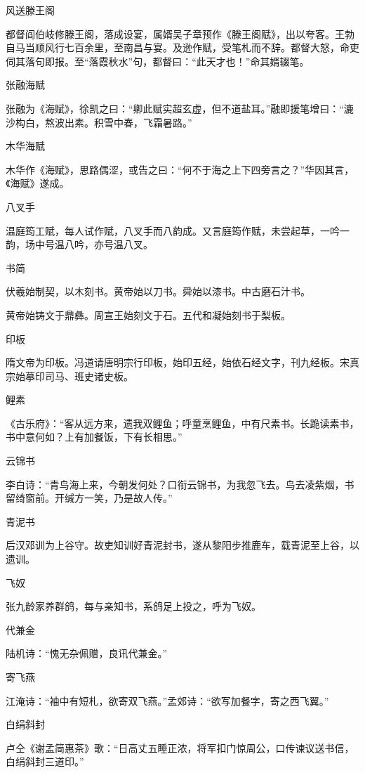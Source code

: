 \documentclass[a4paper,12pt,UTF8,twoside]{ctexbook}
\begin{document}
    风送滕王阁
    
    都督阎伯岐修滕王阁，落成设宴，属婿吴子章预作《滕王阁赋》，出以夸客。王勃自马当顺风行七百余里，至南昌与宴。及逊作赋，受笔札而不辞。都督大怒，命吏伺其落句即报。至“落霞秋水”句，都督曰：“此天才也！”命其婿辍笔。
    
    张融海赋
    
    张融为《海赋》，徐凯之曰：“卿此赋实超玄虚，但不道盐耳。”融即援笔增曰：“漉沙构白，熬波出素。积雪中春，飞霜暑路。”
    
    木华海赋
    
    木华作《海赋》，思路偶涩，或告之曰：“何不于海之上下四旁言之？”华因其言，《海赋》遂成。
    
    八叉手
    
    温庭筠工赋，每人试作赋，八叉手而八韵成。又言庭筠作赋，未尝起草，一吟一韵，场中号温八吟，亦号温八叉。
    
    书简
    
    伏羲始制契，以木刻书。黄帝始以刀书。舜始以漆书。中古磨石汁书。
    
    黄帝始铸文于鼎彝。周宣王始刻文于石。五代和凝始刻书于梨板。
    
    印板
    
    隋文帝为印板。冯道请唐明宗行印板，始印五经，始依石经文字，刊九经板。宋真宗始摹印司马、班史诸史板。
    
    鲤素
    
    《古乐府》：“客从远方来，遗我双鲤鱼；呼童烹鲤鱼，中有尺素书。长跪读素书，书中意何如？上有加餐饭，下有长相思。”
    
    云锦书
    
    李白诗：“青鸟海上来，今朝发何处？口衔云锦书，为我忽飞去。鸟去凌紫烟，书留绮窗前。开缄方一笑，乃是故人传。”
    
    青泥书
    
    后汉邓训为上谷守。故吏知训好青泥封书，遂从黎阳步推鹿车，载青泥至上谷，以遗训。
    
    飞奴
    
    张九龄家养群鸽，每与亲知书，系鸽足上投之，呼为飞奴。
    
    代兼金
    
    陆机诗：“愧无杂佩赠，良讯代兼金。”
    
    寄飞燕
    
    江淹诗：“袖中有短札，欲寄双飞燕。”孟郊诗：“欲写加餐字，寄之西飞翼。”
    
    白绢斜封
    
    卢仝《谢孟简惠茶》歌：“日高丈五睡正浓，将军扣门惊周公，口传谏议送书信，白绢斜封三道印。”
    
\end{document}
